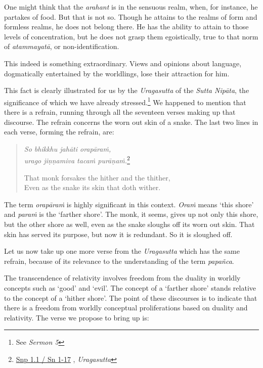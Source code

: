 One might think that the \emph{arahant} is in the sensuous realm, when, for instance, he partakes of food. But that is not so. Though he attains to the realms of form and formless realms, he does not belong there. He has the ability to attain to those levels of concentration, but he does not grasp them egoistically, true to that norm of \emph{atammayatā}, or non-identification.

This indeed is something extraordinary. Views and opinions about language, dogmatically entertained by the worldlings, lose their attraction for him.

This fact is clearly illustrated for us by the \emph{Uragasutta} of the \emph{Sutta Nipāta}, the significance of which we have already stressed.\footnote{See \emph{Sermon 5}} We happened to mention that there is a refrain, running through all the seventeen verses making up that discourse. The refrain concerns the worn out skin of a snake. The last two lines in each verse, forming the refrain, are:

\begin{quote}
\emph{So bhikkhu jahāti orapāraṁ,}\\
\emph{urago jiṇṇamiva tacaṁ purāṇaṁ.}\footnote{\href{https://suttacentral.net/snp1.1/pli/ms}{Snp 1.1 / Sn 1-17} , \emph{Uragasutta}}

That monk forsakes the hither and the thither,\\
Even as the snake its skin that doth wither.
\end{quote}

The term \emph{orapāraṁ} is highly significant in this context. \emph{Oraṁ} means `this shore' and \emph{paraṁ} is the `farther shore'. The monk, it seems, gives up not only this shore, but the other shore as well, even as the snake sloughs off its worn out skin. That skin has served its purpose, but now it is redundant. So it is sloughed off.

Let us now take up one more verse from the \emph{Uragasutta} which has the same refrain, because of its relevance to the understanding of the term \emph{papañca}.

The transcendence of relativity involves freedom from the duality in worldly concepts such as `good' and `evil'. The concept of a `farther shore' stands relative to the concept of a `hither shore'. The point of these discourses is to indicate that there is a freedom from worldly conceptual proliferations based on duality and relativity. The verse we propose to bring up is:

